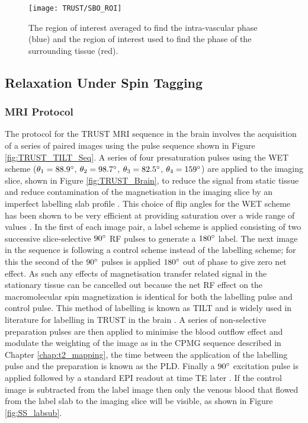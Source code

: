 \begin{figure}[H]
	\centering
	\texttt{[image: TRUST/SBO\_ROI]}
	\caption{The region of interest averaged to find the intra-vascular phase (blue) and the region of interest used to find the phase of the surrounding tissue (red).}
	\label{fig:SBO_ROI}	
\end{figure}


\subsection{\ttwo Relaxation Under Spin Tagging}

\subsubsection{\ac{MRI} Protocol}
\label{sec:TRUST_MRI}

The protocol for the \ac{TRUST} \ac{MRI} sequence in the brain involves the acquisition of a series of paired images using the pulse sequence shown in Figure \ref{fig:TRUST_TILT_Seq}. A series of four presaturation pulses using the \ac{WET} scheme ($\theta_1 = 88.9\degree$, $\theta_2 = 98.7\degree$, $\theta_3 = 82.5\degree$, $\theta_4 = 159\degree$) are applied to the imaging slice, shown in Figure \ref{fig:TRUST_Brain}, to reduce the signal from static tissue and reduce contamination of the magnetisation in the imaging slice by an imperfect labelling slab profile \cite{hendrikse_measurements_2003}. This choice of flip angles for the \ac{WET} scheme has been shown to be very efficient at providing saturation over a wide range of \tone values \cite{golay_pulsed_2005}. In the first of each image pair, a label scheme is applied consisting of two successive slice-selective $90\degree$ \ac{RF} pulses to generate a $180\degree$ label. The next image in the sequence is following a control scheme instead of the labelling scheme; for this the second of the $90\degree$ pulses is applied $180\degree$ out of phase to give zero net effect. As such any effects of magnetisation transfer related signal in the stationary tissue can be cancelled out because the net \ac{RF} effect on the macromolecular spin magnetization is identical for both the labelling pulse and control pulse. This method of labelling is known as \ac{TILT} and is widely used in literature for labelling in \ac{TRUST} in the brain \cite{golay_transfer_1999}. A series of non-selective \ttwo preparation pulses are then applied to minimise the blood outflow effect and modulate the \ttwo weighting of the image as in the \ac{CPMG} sequence described in Chapter \ref{chap:t2_mapping}, the time between the application of the labelling pulse and the \ttwo preparation is known as the \ac{PLD}. Finally a $90\degree$ excitation pulse is applied followed by a standard \ac{EPI} readout at time \ac{TE} later \cite{xu_improving_2012}. If the control image is subtracted from the label image then only the venous blood that flowed from the label slab to the imaging slice will be visible, as shown in Figure \ref{fig:SS_labsub}.

